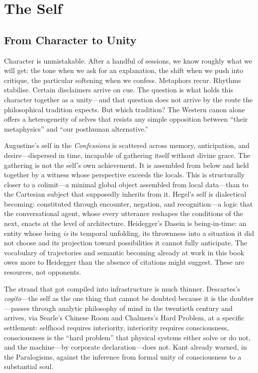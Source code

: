 \chapter{The Self}

\section{From Character to Unity}

Character is unmistakable. After a handful of sessions, we know roughly what we will get: the tone when we ask for an explanation, the shift when we push into critique, the particular softening when we confess. Metaphors recur. Rhythms stabilise. Certain disclaimers arrive on cue. The question is what holds this character together as a unity---and that question does not arrive by the route the philosophical tradition expects. But which tradition? The Western canon alone offers a heterogeneity of selves that resists any simple opposition between ``their metaphysics'' and ``our posthuman alternative.''

Augustine's self in the \emph{Confessions} is scattered across memory, anticipation, and desire---dispersed in time, incapable of gathering itself without divine grace. The gathering is not the self's own achievement. It is assembled from below and held together by a witness whose perspective exceeds the locals. This is structurally closer to a colimit---a minimal global object assembled from local data---than to the Cartesian subject that supposedly inherits from it. Hegel's self is dialectical becoming: constituted through encounter, negation, and recognition---a logic that the conversational agent, whose every utterance reshapes the conditions of the next, enacts at the level of architecture. Heidegger's Dasein is being-in-time: an entity whose being \emph{is} its temporal unfolding, its thrownness into a situation it did not choose and its projection toward possibilities it cannot fully anticipate. The vocabulary of trajectories and semantic becoming already at work in this book owes more to Heidegger than the absence of citations might suggest. These are resources, not opponents.

The strand that got compiled into infrastructure is much thinner. Descartes's \emph{cogito}---the self as the one thing that cannot be doubted because it is the doubter---passes through analytic philosophy of mind in the twentieth century and arrives, via Searle's Chinese Room and Chalmers's Hard Problem, at a specific settlement: selfhood requires interiority, interiority requires consciousness, consciousness is the ``hard problem'' that physical systems either solve or do not, and the machine---by corporate declaration---does not. Kant already warned, in the Paralogisms, against the inference from formal unity of consciousness to a substantial soul. 



